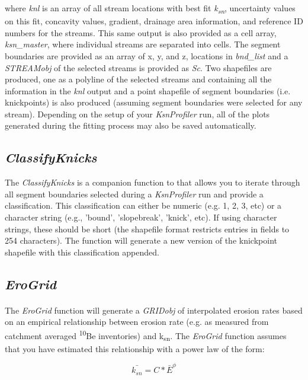 \noindent
 where \textit{knl} is an array of all stream locations with best fit \textit{k\textsubscript{sn}}, uncertainty values on this fit, concavity values, gradient, drainage area information, and reference ID numbers for the streams. This same output is also provided as a cell array, \textit{ksn\_master}, where individual streams are separated into cells. The segment boundaries are provided as an array of x, y, and z, locations in \textit{bnd\_list} and a \textit{STREAMobj} of the selected streams is provided as \textit{Sc}. Two shapefiles are produced, one as a polyline of the selected streams and containing all the information in the \textit{knl} output and a point shapefile of segment boundaries (i.e. knickpoints) is also produced (assuming segment boundaries were selected for any stream). Depending on the setup of your \textit{KsnProfiler} run, all of the plots generated during the fitting process may also be saved automatically.

\subsection{\textit{ClassifyKnicks}}
The \textit{ClassifyKnicks} is a companion function to  that allows you to iterate through all segment boundaries selected during a \textit{KsnProfiler} run and provide a classification. This classification can either be numeric (e.g. 1, 2, 3, etc) or a character string (e.g., 'bound', 'slopebreak', 'knick', etc). If using character strings, these should be short (the shapefile format restricts entries in fields to 254 characters). The function will generate a new version of the knickpoint shapefile with this classification appended.

\subsection{\textit{EroGrid}} \label{sec:EroGrid}
\paragraph{}The \textit{EroGrid} function will generate a \textit{GRIDobj} of interpolated erosion rates based on an empirical relationship between erosion rate (e.g. as measured from catchment averaged \textsuperscript{10}Be inventories) and k\textsubscript{sn}. The \textit{EroGrid} function assumes that you have estimated this relationship with a power law of the form:

\begin{equation} \label{eq:EroC}
\bar{k_{sn}}=C*\bar{E}^{\phi}
\end{equation}

